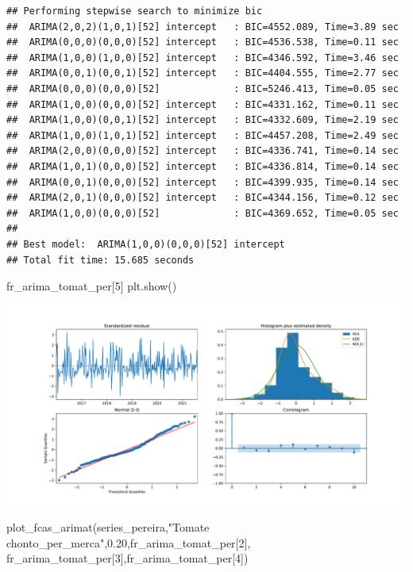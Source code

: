 \documentclass[
]{book}
\newenvironment{Shaded}{\begin{snugshade}}{\end{snugshade}}
\newcommand{\DecValTok}[1]{\textcolor[rgb]{0.00,0.00,0.81}{#1}}
\newcommand{\FloatTok}[1]{\textcolor[rgb]{0.00,0.00,0.81}{#1}}
\newcommand{\NormalTok}[1]{#1}
\newcommand{\StringTok}[1]{\textcolor[rgb]{0.31,0.60,0.02}{#1}}
\begin{document}
\begin{verbatim}
## Performing stepwise search to minimize bic
##  ARIMA(2,0,2)(1,0,1)[52] intercept   : BIC=4552.089, Time=3.89 sec
##  ARIMA(0,0,0)(0,0,0)[52] intercept   : BIC=4536.538, Time=0.11 sec
##  ARIMA(1,0,0)(1,0,0)[52] intercept   : BIC=4346.592, Time=3.46 sec
##  ARIMA(0,0,1)(0,0,1)[52] intercept   : BIC=4404.555, Time=2.77 sec
##  ARIMA(0,0,0)(0,0,0)[52]             : BIC=5246.413, Time=0.05 sec
##  ARIMA(1,0,0)(0,0,0)[52] intercept   : BIC=4331.162, Time=0.11 sec
##  ARIMA(1,0,0)(0,0,1)[52] intercept   : BIC=4332.609, Time=2.19 sec
##  ARIMA(1,0,0)(1,0,1)[52] intercept   : BIC=4457.208, Time=2.49 sec
##  ARIMA(2,0,0)(0,0,0)[52] intercept   : BIC=4336.741, Time=0.14 sec
##  ARIMA(1,0,1)(0,0,0)[52] intercept   : BIC=4336.814, Time=0.14 sec
##  ARIMA(0,0,1)(0,0,0)[52] intercept   : BIC=4399.935, Time=0.14 sec
##  ARIMA(2,0,1)(0,0,0)[52] intercept   : BIC=4344.156, Time=0.12 sec
##  ARIMA(1,0,0)(0,0,0)[52]             : BIC=4369.652, Time=0.05 sec
## 
## Best model:  ARIMA(1,0,0)(0,0,0)[52] intercept
## Total fit time: 15.685 seconds
\end{verbatim}

\begin{Shaded}
\begin{Highlighting}[]
\NormalTok{fr\_arima\_tomat\_per[}\DecValTok{5}\NormalTok{]}
\NormalTok{plt.show()}
\end{Highlighting}
\end{Shaded}

\includegraphics{bookdown-demo_files/figure-latex/unnamed-chunk-169-165.pdf}

\begin{Shaded}
\begin{Highlighting}[]


\NormalTok{plot\_fcas\_arimat(series\_pereira,}\StringTok{"Tomate chonto\_per\_merca"}\NormalTok{,}\FloatTok{0.20}\NormalTok{,fr\_arima\_tomat\_per[}\DecValTok{2}\NormalTok{],}
\NormalTok{fr\_arima\_tomat\_per[}\DecValTok{3}\NormalTok{],fr\_arima\_tomat\_per[}\DecValTok{4}\NormalTok{])}
\end{Highlighting}
\end{Shaded}
\end{document}
